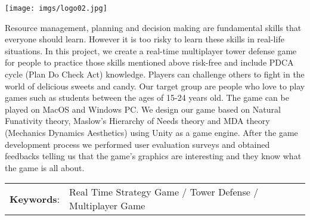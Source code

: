 \documentclass[12pt,oneside,openright,a4paper]{cpe-thai-project}
\begin{document}
\pdfstringdefDisableCommands{%
\let\MakeUppercase\relax
}

\begin{center}
  \texttt{[image: imgs/logo02.jpg]}
\end{center}
\vspace*{-1cm}

\maketitlepage
\makesignaturepage 


\abstract

Resource management, planning and decision making are fundamental skills 
that everyone should learn. However it is too risky to learn these skills 
in real-life situations. In this project, we create a real-time multiplayer 
tower defense game for people to practice those skills mentioned above 
risk-free and include PDCA cycle (Plan Do Check Act) knowledge. 
Players can challenge others to fight in the world of delicious sweets and candy. 
Our target group are people who love to play games such as students between 
the ages of 15-24 years old. The game can be played on MacOS and Windows PC. 
We design our game based on Natural Funativity theory, Maslow’s Hierarchy of Needs theory 
and MDA theory (Mechanics Dynamics Aesthetics) using Unity as a game engine. 
After the game development process 
we performed user evaluation surveys and obtained feedbacks telling us that the game’s graphics are 
interesting and they know what the game is all about.
\begin{flushleft}
\begin{tabular*}{\textwidth}{@{}lp{}}
\textbf{Keywords}: & Real Time Strategy Game / Tower Defense / Multiplayer Game
\end{tabular*}
\end{flushleft}
\endabstract


\thaiabstract
\end{document}

